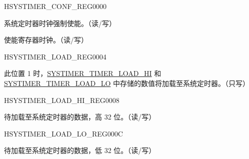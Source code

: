 \begin{register}{H}{SYSTIMER\_CONF\_REG}{\hexprefix{}0000}\label{regdesc:SYSTIMERCONFREG}
%
%
%
\regnewline%
\begin{regdesc}\begin{reglist}
\label{fielddesc:SYSTIMERCLKFO}\item [SYSTIMER\_CLK\_FO] 系统定时器时钟强制使能。（读/写）
\label{fielddesc:SYSTIMERCLKEN}\item [SYSTIMER\_CLK\_EN] 使能寄存器时钟。（读/写）
\end{reglist}\end{regdesc}
\end{register}


\begin{register}{H}{SYSTIMER\_LOAD\_REG}{\hexprefix{}0004}\label{regdesc:SYSTIMERLOADREG}
%
%
\regnewline%
\begin{regdesc}\begin{reglist}
\label{fielddesc:SYSTIMERTIMERLOAD}\item [SYSTIMER\_TIMER\_LOAD] 此位置 1 时，\hyperref[fielddesc:SYSTIMERTIMERLOADHI]{SYSTIMER\_TIMER\_LOAD\_HI} 和 \hyperref[fielddesc:SYSTIMERTIMERLOADLO]{SYSTIMER\_TIMER\_LOAD\_LO} 中存储的数值将加载至系统定时器。（只写）
\end{reglist}\end{regdesc}
\end{register}


\begin{register}{H}{SYSTIMER\_LOAD\_HI\_REG}{\hexprefix{}0008}\label{regdesc:SYSTIMERLOADHIREG}
%
\regnewline%
\begin{regdesc}\begin{reglist}
\label{fielddesc:SYSTIMERTIMERLOADHI}\item [SYSTIMER\_TIMER\_LOAD\_HI] 待加载至系统定时器的数据，高 32 位。（读/写）
\end{reglist}\end{regdesc}
\end{register}


\begin{register}{H}{SYSTIMER\_LOAD\_LO\_REG}{\hexprefix{}000C}\label{regdesc:SYSTIMERLOADLOREG}
%
\regnewline%
\begin{regdesc}\begin{reglist}
\label{fielddesc:SYSTIMERTIMERLOADLO}\item [SYSTIMER\_TIMER\_LOAD\_LO] 待加载至系统定时器的数据，低 32 位。（读/写）
\end{reglist}\end{regdesc}
\end{register}


